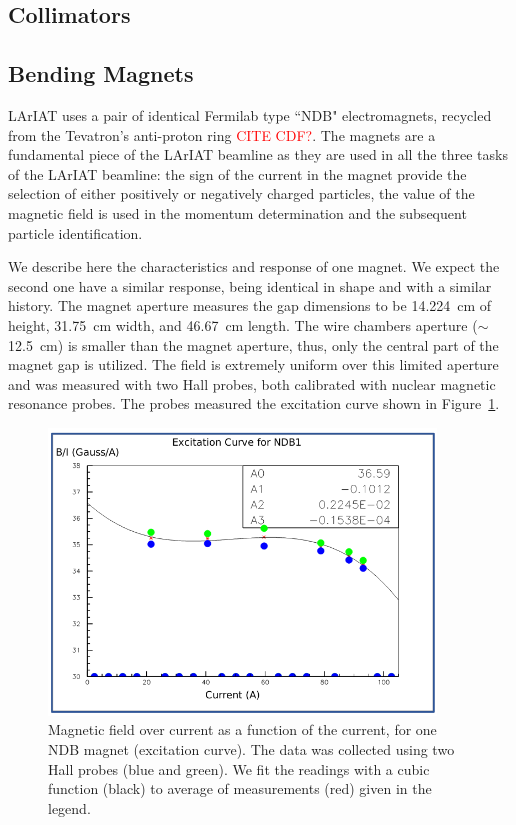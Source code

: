 \subsection{Collimators}\label{sec:Collimators}

\subsection{Bending Magnets}\label{sec:Magnets}
LArIAT uses a pair of identical Fermilab type ``NDB" electromagnets, recycled from the Tevatron's anti-proton ring \textcolor{red}{CITE CDF?}. 
The magnets are a fundamental piece of the LArIAT beamline as they are used in all the three tasks of the LArIAT beamline: the sign of the current in the magnet provide the selection of either positively or negatively charged particles, the value of the magnetic field is used in the momentum determination and the subsequent particle identification. 

We describe here the characteristics and response of one magnet. We expect the second one have a similar response, being identical in shape and with a similar history. The magnet aperture measures the gap dimensions to be 14.224~cm of height, 31.75~cm width, and  46.67~cm length.  The wire chambers aperture ($\sim$12.5~cm) is smaller than the magnet aperture, thus, only the central part of the magnet gap is utilized. The field is extremely uniform over this limited aperture and was measured with two Hall probes, both calibrated with nuclear magnetic resonance probes. The probes measured the excitation curve shown in Figure~\ref{fig:magnet_excitation}. 

\begin{figure}[!h]
\begin{centering}
\vspace{-0.3cm}
\includegraphics[height=3.0in]{Chapter-3/Images/ExcitationCurves.png}
\caption{
{ Magnetic field over current as a function of the current, for one NDB magnet (excitation curve). The data was collected using two Hall probes (blue and green). We fit the readings with a cubic function (black) to average of measurements (red) given in the legend.}
}
\label{fig:magnet_excitation}
\end{centering}
\end{figure}

